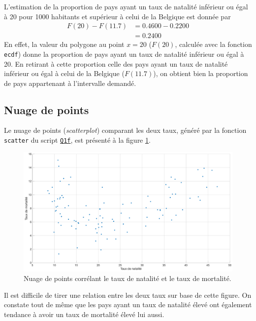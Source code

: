 \documentclass[a4paper, 12pt]{article}
\begin{document}
	L'estimation de la proportion de pays ayant un taux de natalité inférieur ou égal à \num{20} pour \num{1000} habitants et supérieur à celui de la Belgique est donnée par
	\begin{align*}
	    F\left (\num{20}\right ) - F\left (\num{11.7}\right ) &= \num{0.4600} - \num{0.2200}\\
	    &= \num{0.2400}
	\end{align*}
	En effet, la valeur du polygone au point \(x = \num{20}\) (\(F\left (\num{20}\right )\), calculée avec la fonction \texttt{ecdf}) donne la proportion de pays ayant un taux de natalité inférieur ou égal à \num{20}. En retirant à cette proportion celle des pays ayant un taux de natalité inférieur ou égal à celui de la Belgique (\(F\left (\num{11.7}\right )\)), on obtient bien la proportion de pays appartenant à l'intervalle demandé.
	
	\subsection{Nuage de points}
	Le nuage de points (\textit{scatterplot}) comparant les deux taux, généré par la fonction \texttt{scatter} du script \hyperref[subsec:code-Q1]{\texttt{Q1f}}, est présenté à la figure \ref{fig:Q1f}.\par
	
	\begin{figure}[!ht]
	    \centering
	    \includegraphics[width=\textwidth]{resources/pdf/figures/Q1f.pdf}
	    \caption{Nuage de points corrélant le taux de natalité et le taux de mortalité.}
	    \label{fig:Q1f}
	\end{figure}
	
	Il est difficile de tirer une relation entre les deux taux sur base de cette figure. On constate tout de même que les pays ayant un taux de natalité élevé ont également tendance à avoir un taux de mortalité élevé lui aussi.\par
	
\end{document}
